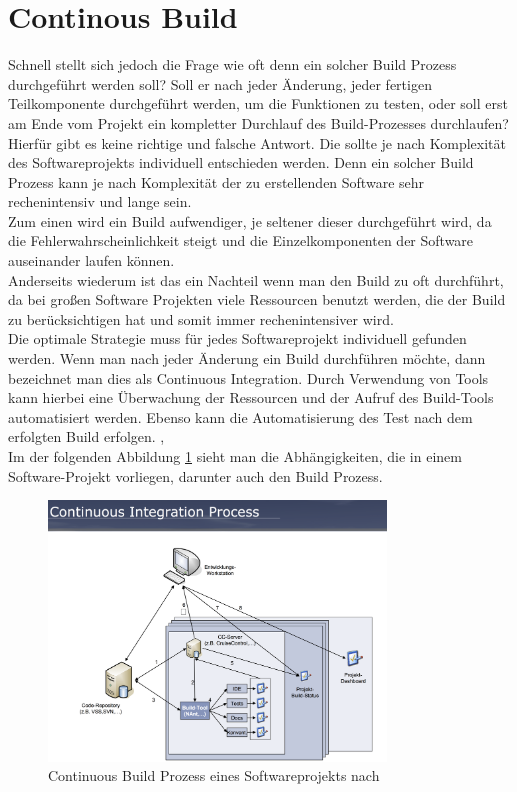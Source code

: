 \section{Continous Build}
Schnell stellt sich jedoch die Frage wie oft denn ein solcher Build Prozess durchgeführt werden soll? Soll er nach jeder Änderung, jeder fertigen Teilkomponente durchgeführt werden, um die Funktionen zu testen, oder soll erst am Ende vom Projekt ein kompletter Durchlauf des Build-Prozesses durchlaufen?
\\
Hierfür gibt es keine richtige und falsche Antwort. Die sollte je nach Komplexität des Softwareprojekts individuell entschieden werden. Denn ein solcher Build Prozess kann je nach Komplexität der zu erstellenden Software sehr rechenintensiv und lange sein. 
\\
Zum einen wird ein Build aufwendiger, je seltener dieser durchgeführt wird, da die Fehlerwahrscheinlichkeit steigt und die Einzelkomponenten der Software auseinander laufen können.
\\
Anderseits wiederum ist das ein Nachteil wenn man den Build zu oft durchführt, da bei großen Software Projekten viele Ressourcen benutzt werden, die der Build zu berücksichtigen hat und somit immer rechenintensiver wird.
\\
Die optimale Strategie muss für jedes Softwareprojekt individuell gefunden werden.
Wenn man nach jeder Änderung ein Build durchführen möchte, 
dann bezeichnet man dies als Continuous Integration.
Durch Verwendung von Tools kann hierbei eine Überwachung der Ressourcen und der Aufruf des Build-Tools automatisiert werden. Ebenso kann die Automatisierung des Test nach dem erfolgten Build erfolgen. \cite{build-seminar}, \cite{software-analysis}
\\
Im der folgenden Abbildung \ref{fig:ci} sieht man die Abhängigkeiten, die in einem Software-Projekt vorliegen, darunter auch den Build Prozess.

\begin{figure}[H]
	\includegraphics[width=0.8\textwidth]{img/continuousintegration.png}
	\caption{Continuous Build Prozess eines Softwareprojekts nach \cite{build-continuous}}
\label{fig:ci}
\end{figure}

